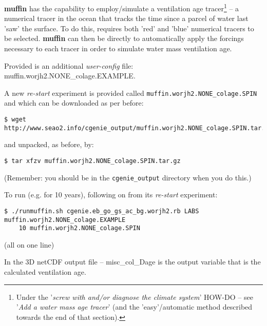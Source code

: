 \documentclass[11pt,fleqn]{book} %
\begin{document}
\textbf{muffin} has the capability to employ/simulate a ventilation age tracer\footnote{Under the '\textit{screw with and/or diagnose the climate system}' HOW-DO -- see '\textit{Add a water mass age tracer}' (and the 'easy'/automatic method described towards the end of that section).} -- a numerical tracer in the ocean that tracks the time since a parcel of water last 'saw' the surface. To do this, requires both 'red' and 'blue' numerical tracers to be selected.  \textbf{muffin} can then be directly to automatically apply the forcings necessary to each tracer in order to simulate water mass ventilation age.

Provided is an additional \textit{user-config} file: \textsf{\footnotesize muffin.worjh2.NONE\_colage.EXAMPLE}.

A new \textit{re-start} experiment is provided called \texttt{muffin.worjh2.NONE\_colage.SPIN} and which can be downloaded as per before:

\vspace{-1mm}
\small
\begin{verbatim}
$ wget http://www.seao2.info/cgenie_output/muffin.worjh2.NONE_colage.SPIN.tar.gz
\end{verbatim}
\normalsize
\vspace{-1mm}

\noindent and unpacked, as before, by:

\vspace{-1mm}
\begin{verbatim}
$ tar xfzv muffin.worjh2.NONE_colage.SPIN.tar.gz
\end{verbatim}
\vspace{-1mm}

\noindent (Remember: you should be in the \texttt{cgenie\_output} directory when you do this.)

To run (e.g. for 10 years), following on from its \textit{re-start} experiment:

\vspace{-1mm}
\small
\begin{verbatim}
$ ./runmuffin.sh cgenie.eb_go_gs_ac_bg.worjh2.rb LABS muffin.worjh2.NONE_colage.EXAMPLE
    10 muffin.worjh2.NONE_colage.SPIN
\end{verbatim}
\normalsize
\vspace{-1mm}

\noindent (all on one line)

In the 3D netCDF output file -- \textsf{\footnotesize misc\_col\_Dage} is the output variable that is the calculated ventilation age.
\end{document}

